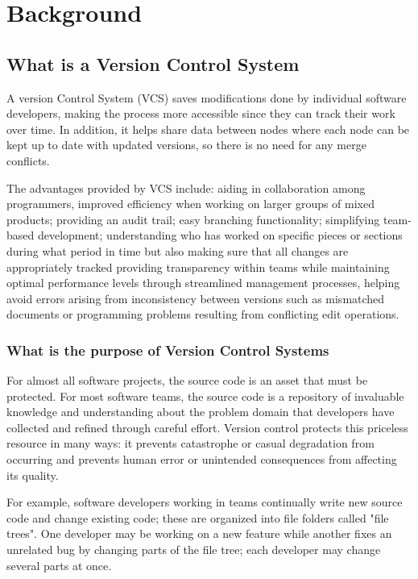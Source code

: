 \lstset{language=bash}
\newpage
\chapter{Background}
\section{What is a Version Control System}
A version Control System (VCS) saves modifications done by individual software developers, making the process more accessible since they can track their work over time. In addition, it helps share data between nodes where each node can be kept up to date with updated versions, so there is no need for any merge conflicts.

The advantages provided by VCS include: aiding in collaboration among programmers, improved efficiency when working on larger groups of mixed products; providing an audit trail; easy branching functionality; simplifying team-based development; understanding who has worked on specific pieces or sections during what period in time but also making sure that all changes are appropriately tracked providing transparency within teams while maintaining optimal performance levels through streamlined management processes, helping avoid errors arising from inconsistency between versions such as mismatched documents or programming problems resulting from conflicting edit operations.
\subsection{What is the purpose of Version Control Systems}
For almost all software projects, the source code is an asset that must be protected. For most software teams, the source code is a repository of invaluable knowledge and understanding about the problem domain that developers have collected and refined through careful effort. Version control protects this priceless resource in many ways: it prevents catastrophe or casual degradation from occurring and prevents human error or unintended consequences from affecting its quality.

For example, software developers working in teams continually write new source code and change existing code; these are organized into file folders called "file trees". One developer may be working on a new feature while another fixes an unrelated bug by changing parts of the file tree; each developer may change several parts at once.

